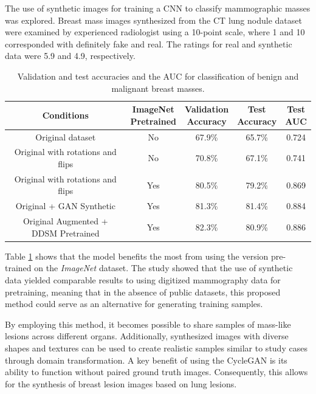 The use of synthetic images for training a CNN to classify mammographic masses was explored. Breast mass images synthesized from the CT lung nodule dataset were examined by experienced radiologist using a 10-point scale, where 1 and 10 corresponded with definitely fake and real. The ratings for real and synthetic data were 5.9 and 4.9, respectively.

\begin{table}[ht]
\centering
\caption{Validation and test accuracies and the AUC for classification of benign and malignant breast masses.}
\begin{tabular}{|c|c|c|c|c|}
\hline
Conditions & \makecell{ImageNet\\Pretrained} & \makecell{Validation\\Accuracy} & \makecell{Test\\Accuracy} & \makecell{Test\\AUC} \\ \hline
Original dataset   &  No                   & 67.9\%              & 65.7\%        & 0.724   \\ \hline
Original with rotations and flips   &  No                   & 70.8\%              & 67.1\%        & 0.741   \\ \hline
Original with rotations and flips  & Yes                   & 80.5\%              & 79.2\%        & 0.869   \\ \hline
Original + GAN Synthetic   & Yes                   & 81.3\%              & 81.4\%        & 0.884   \\ \hline
Original Augmented + DDSM Pretrained   & Yes                   & 82.3\%              & 80.9\%        & 0.886   \\ \hline
\end{tabular}
\label{tab:cycleGANBreast}
\end{table}

Table \ref{tab:cycleGANBreast} shows that the model benefits the most from using the version pre-trained on the \textit{ImageNet} dataset. The study showed that the use of synthetic data yielded comparable results to using digitized mammography data for pretraining, meaning that in the absence of public datasets, this proposed method could serve as an alternative for generating training samples.

By employing this method, it becomes possible to share samples of mass-like lesions across different organs. Additionally, synthesized images with diverse shapes and textures can be used to create realistic samples similar to study cases through domain transformation. A key benefit of using the CycleGAN is its ability to function without paired ground truth images. Consequently, this allows for the synthesis of breast lesion images based on lung lesions.

